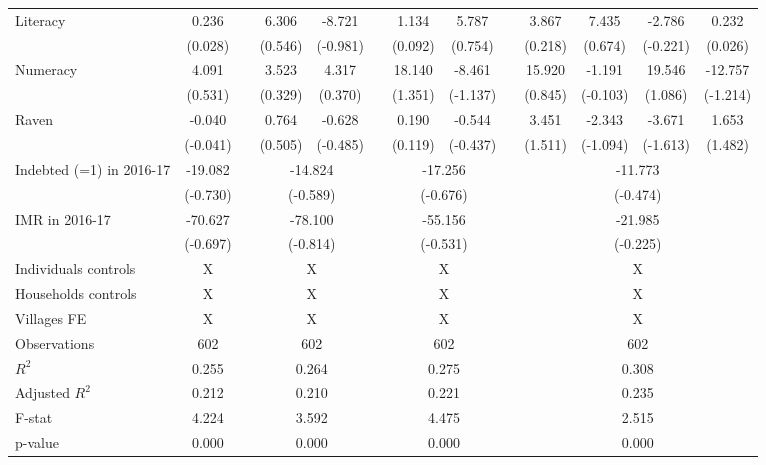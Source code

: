 \begin{table}[htbp]
{\begin{tabular}{lcccccccccccc}
    Literacy & 0.236 &   & 6.306 & -8.721 &   & 1.134 & 5.787 &   & 3.867 & 7.435 & -2.786 & 0.232 \\
      & (0.028) &   & (0.546) & (-0.981) &   & (0.092) & (0.754) &   & (0.218) & (0.674) & (-0.221) & (0.026) \\
    Numeracy & 4.091 &   & 3.523 & 4.317 &   & 18.140 & -8.461 &   & 15.920 & -1.191 & 19.546 & -12.757 \\
      & (0.531) &   & (0.329) & (0.370) &   & (1.351) & (-1.137) &   & (0.845) & (-0.103) & (1.086) & (-1.214) \\
    Raven & -0.040 &   & 0.764 & -0.628 &   & 0.190 & -0.544 &   & 3.451 & -2.343 & -3.671 & 1.653 \\
      & (-0.041) &   & (0.505) & (-0.485) &   & (0.119) & (-0.437) &   & (1.511) & (-1.094) & (-1.613) & (1.482) \\

\cmidrule{1-2}\cmidrule{4-5}\cmidrule{7-8}\cmidrule{10-13}    Indebted (=1) in 2016-17 & -19.082 &       & \multicolumn{2}{c}{-14.824} &       & \multicolumn{2}{c}{-17.256} &       & \multicolumn{4}{c}{-11.773} \\
          & (-0.730) &       & \multicolumn{2}{c}{(-0.589)} &       & \multicolumn{2}{c}{(-0.676)} &       & \multicolumn{4}{c}{(-0.474)} \\
    IMR in 2016-17 & -70.627 &       & \multicolumn{2}{c}{-78.100} &       & \multicolumn{2}{c}{-55.156} &       & \multicolumn{4}{c}{-21.985} \\
          & (-0.697) &       & \multicolumn{2}{c}{(-0.814)} &       & \multicolumn{2}{c}{(-0.531)} &       & \multicolumn{4}{c}{(-0.225)} \\
    Individuals controls & X     &       & \multicolumn{2}{c}{X} &       & \multicolumn{2}{c}{X} &       & \multicolumn{4}{c}{X} \\
    Households controls & X     &       & \multicolumn{2}{c}{X} &       & \multicolumn{2}{c}{X} &       & \multicolumn{4}{c}{X} \\
    Villages FE & X     &       & \multicolumn{2}{c}{X} &       & \multicolumn{2}{c}{X} &       & \multicolumn{4}{c}{X} \\
    \midrule
    Observations & 602   &       & \multicolumn{2}{c}{602} &       & \multicolumn{2}{c}{602} &       & \multicolumn{4}{c}{602} \\
    $R^2$ & 0.255 &       & \multicolumn{2}{c}{0.264} &       & \multicolumn{2}{c}{0.275} &       & \multicolumn{4}{c}{0.308} \\
    Adjusted $R^2$ & 0.212 &       & \multicolumn{2}{c}{0.210} &       & \multicolumn{2}{c}{0.221} &       & \multicolumn{4}{c}{0.235} \\
    F-stat & 4.224 &       & \multicolumn{2}{c}{3.592} &       & \multicolumn{2}{c}{4.475} &       & \multicolumn{4}{c}{2.515} \\
    p-value & 0.000 &       & \multicolumn{2}{c}{0.000} &       & \multicolumn{2}{c}{0.000} &       & \multicolumn{4}{c}{0.000} \\
    \bottomrule


\end{tabular}}
\end{table}
